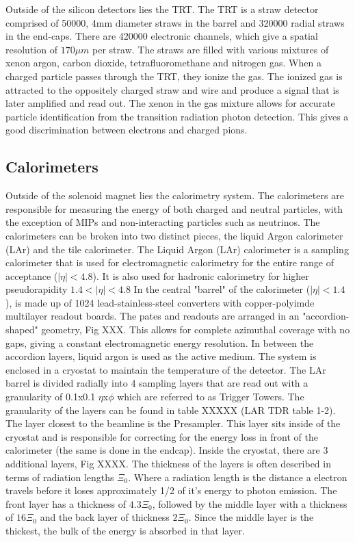\indent Outside of the silicon detectors lies the TRT. The TRT is a straw detector comprised of 50000, 4mm diameter straws in the barrel and 320000 radial straws in the end-caps. There are 420000 electronic channels, which give a spatial resolution of ${170\mu{m}}$ per straw. The straws are filled with various mixtures of xenon argon, carbon dioxide, tetrafluoromethane and nitrogen gas. When a charged particle passes through the TRT, they ionize the gas. The ionized gas is attracted to the oppositely charged straw and wire and produce a signal that is later amplified and read out. The xenon in the gas mixture allows for accurate particle identification from the transition radiation photon detection.  This gives a good discrimination between electrons and charged pions.

\subsection{Calorimeters}\label{ssec:calo}
Outside of the solenoid magnet lies the calorimetry system. The calorimeters are responsible for measuring the energy of both charged and neutral particles, with the exception of MIPs and non-interacting particles such as neutrinos. The calorimeters can be broken into two distinct pieces, the liquid Argon calorimeter (LAr) and the tile calorimeter. \linebreak
\indent The Liquid Argon (LAr) calorimeter is a sampling calorimeter that is used for electromagnetic calorimetry for the entire range of acceptance (${|\eta{}|<4.8}$). It is also used for hadronic calorimetry for higher pseudorapidity ${1.4<|\eta{}|<4.8}$ In the central "barrel" of the calorimeter (${|\eta{}| < 1.4}$), is made up of 1024 lead-stainless-steel converters with copper-polyimde multilayer readout boards. The pates and readouts are arranged in an "accordion-shaped" geometry, Fig XXX. This allows for complete azimuthal coverage with no gaps, giving a constant electromagnetic energy resolution. In between the accordion layers, liquid argon is used as the active medium. The system is enclosed in a cryostat to maintain the temperature of the detector. The LAr barrel is divided radially into 4 sampling layers that are read out with a granularity of 0.1x0.1 ${\eta}$x${\phi}$ which are referred to as Trigger Towers. The granularity of the layers can be found in table XXXXX (LAR TDR table 1-2). The layer closest to the beamline is the Presampler. This layer sits inside of the cryostat and is responsible for  correcting for the energy loss in front of the calorimeter (the same is done in the endcap). Inside the cryostat, there are 3 additional layers, Fig XXXX. The thickness of the layers is often described in terms of radiation lengths ${\Xi_{0}}$. Where a radiation length is the distance a electron travels before it loses approximately 1/2 of it's energy to photon emission.  The front layer has a thickness of ${4.3\Xi_{0}}$, followed by the middle layer with a thickness of ${16\Xi_{0}}$ and the back layer of thickness ${2\Xi_{0}}$. Since the middle layer is the thickest, the bulk of the energy is absorbed in that layer. \linebreak 
